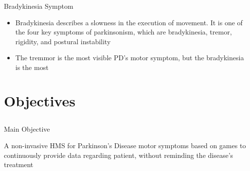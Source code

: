 \documentclass{beamer}
\begin{document}
\begin{frame}{Bradykinesia Symptom}
  \begin{block}{}
      \begin{itemize}
				\item Bradykinesia describes a slowness in the execution of movement. It is one of the four key symptoms of parkinsonism, which are bradykinesia, tremor, rigidity, and postural instability
				\item The tremmor is the most visible PD's motor symptom, but the bradykinesia is the most
	\end{itemize}
  \end{block}
\end{frame}
  


\section{Objectives}
\subsection{}
\begin{frame}{Main Objective}
		 \begin{block}{}
				A non-invasive HMS for Parkinson's Disease motor symptoms based on games to continuously provide data regarding patient, without reminding the disease's treatment
		 \end{block}
     \begin{block}{}
     \begin{center}		
		
      \end{center}
    \end{block}
\end{frame}

\end{document}
